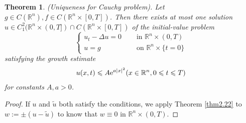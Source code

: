 \documentclass[hyperref,UTF8,12pt]{article}
\numberwithin{equation}{subsection}
\theoremstyle{plain}
\newtheorem{theorem}{Theorem}
\theoremstyle{definition}
\numberwithin{theorem}{section}
\numberwithin{lemma}{section}
\numberwithin{proposition}{section}
\numberwithin{remark}{section}
\numberwithin{corollary}{section}
\numberwithin{definition}{section}
\numberwithin{problem}{section}
\numberwithin{example}{section}
\def\e{\textup{e}}
\newcommand{\mr}{\mathbb{R}}
\renewcommand{\leq}{\leqslant}
\begin{document}
\begin{theorem}\label{thm2.23}
(Uniqueness for Cauchy problem). Let $g\in C(\mr^n),f\in C(\mr^n\times[0,T])$. Then there exists at most one solution $u\in C_1^2(\mr^n\times(0,T])\cap C(\mr^n\times[0,T])$ of the initial-value problem\[\left\{\begin{aligned}
	u_t-\Delta u=0&\quad\text{ in } \mr^n\times(0,T)\\
	u=g&\quad\text{ on }\mr^n\times\{t=0\}
\end{aligned}\right.\]satisfying the growth estimate\[u(x,t)\leq A\e^{a|x|^2}(x\in\mr^n,0\leq t\leq T)\]for constants $A,a>0$.
\end{theorem}
\begin{proof}
If $u$ and $\tilde{u}$ both satisfy the conditions, we apply Theorem \ref{thm2.22} to $w:=\pm(u-\tilde{u})$ to know that $w\equiv0$ in $\mr^n\times(0,T)$.
\end{proof}
\end{document}
